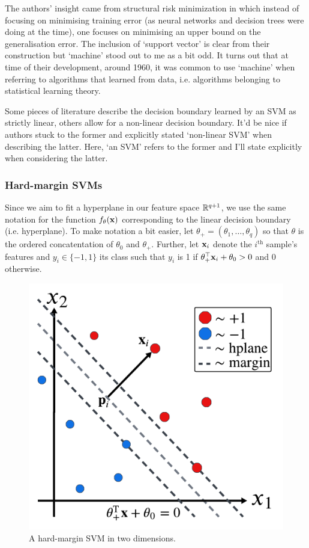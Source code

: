 \documentclass[11pt]{article}
\begin{document}
The authors' insight came from structural risk minimization in which instead of focusing on minimising training error (as neural networks and decision trees were doing at the time), one focuses on minimising an upper bound on the generalisation error. The inclusion of `support vector' is clear from their construction but `machine' stood out to me as a bit odd. It turns out that at time of their development, around 1960, it was common to use `machine' when referring to algorithms that learned from data, i.e. algorithms belonging to statistical learning theory.

\begin{tcolorbox}[title={\centering\centering\textbf{Inconsistent terminology surrounding SVMs}}, colback=myLightBlue, colbacktitle=myDarkBlue, colframe=myDarkBlue, coltitle=white]
    Some pieces of literature describe the decision boundary learned by an SVM as strictly linear, others allow for a non-linear decision boundary. It'd be nice if authors stuck to the former and explicitly stated `non-linear SVM' when describing the latter. Here, `an SVM' refers to the former and I'll state explicitly when considering the latter.
\end{tcolorbox}

\subsubsection{Hard-margin SVMs}
Since we aim to fit a hyperplane in our feature space $\mathbb{R}^{q+1}$, we use the same notation for the function $f_{\theta}(\mathbf{x})$ corresponding to the linear decision boundary (i.e. hyperplane). To make notation a bit easier, let $\theta_+=(\theta_1,\dots,\theta_q)$ so that $\theta$ is the ordered concatentation of $\theta_0$ and $\theta_+$. Further, let $\mathbf{x}_i$ denote the $i^{\text{th}}$ sample's features and $y_i\in\{-1,1\}$ its class such that $y_i$ is 1 if $\theta_+^\top \mathbf{x}_i+\theta_0>0$ and 0 otherwise.

\begin{figure}[t]
    \centering
    \includegraphics[width=0.75\columnwidth]{./figures/supervised_learning/SVMs/SVM_hard_margin.pdf}
    \caption{A hard-margin SVM in two dimensions.}
    \label{fig:SVM_hard_margin}
\end{figure}
\end{document}

